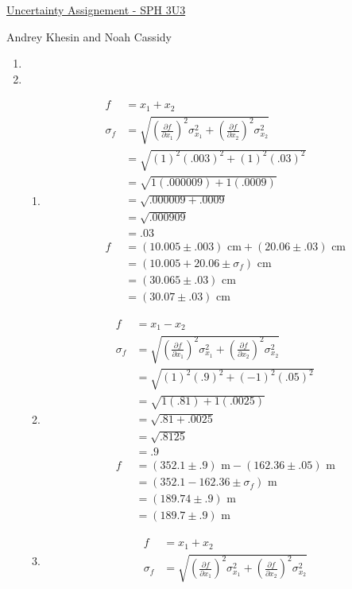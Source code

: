 \documentclass{article}
\begin{document}
\centerline{\sc \large \underline{Uncertainty Assignement - SPH 3U3}}
\centerline{\sc Andrey Khesin and Noah Cassidy}
\centerline{}

\begin{enumerate}
\item 
\item
\begin{enumerate}
\item
\begin{align*}
f &= x_{1} + x_{2}\\
\sigma_{f} &= \sqrt{(\frac{\partial f}{\partial x_{1}})^2\sigma_{x_{1}}^2 + (\frac{\partial f}{\partial x_{2}})^2\sigma_{x_{2}}^2}\\
&= \sqrt{(1)^2(.003)^2 + (1)^2(.03)^2}\\
&= \sqrt{1(.000009) + 1(.0009)}\\
&= \sqrt{.000009 + .0009}\\
&= \sqrt{.000909}\\
&= .03\\
f &= (10.005 \pm .003)\text{ cm} + (20.06 \pm .03)\text{ cm}\\
&= (10.005 + 20.06 \pm \sigma_{f})\text{ cm}\\
&= (30.065 \pm .03)\text{ cm}\\
&= (30.07 \pm .03)\text{ cm}
\end{align*}
\item
\begin{align*}
f &= x_{1} - x_{2}\\
\sigma_{f} &= \sqrt{(\frac{\partial f}{\partial x_{1}})^2\sigma_{x_{1}}^2 + (\frac{\partial f}{\partial x_{2}})^2\sigma_{x_{2}}^2}\\
&= \sqrt{(1)^2(.9)^2 + (-1)^2(.05)^2}\\
&= \sqrt{1(.81) + 1(.0025)}\\
&= \sqrt{.81 + .0025}\\
&= \sqrt{.8125}\\
&= .9\\
f &= (352.1 \pm .9)\text{ m} - (162.36 \pm .05)\text{ m}\\
&= (352.1 - 162.36 \pm \sigma_{f})\text{ m}\\
&= (189.74 \pm .9)\text{ m}\\
&= (189.7 \pm .9)\text{ m}
\end{align*}
\item
\begin{align*}
f &= x_{1} + x_{2}\\
\sigma_{f} &= \sqrt{(\frac{\partial f}{\partial x_{1}})^2\sigma_{x_{1}}^2 + (\frac{\partial f}{\partial x_{2}})^2\sigma_{x_{2}}^2}\\

\end{align*}
\end{enumerate}
\end{enumerate}
\end{document}
